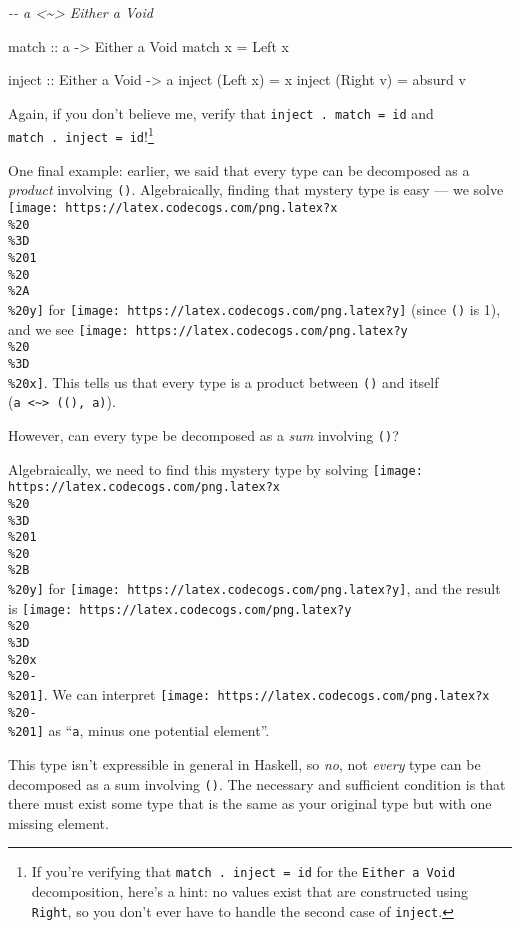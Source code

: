 \documentclass[]{article}
\newenvironment{Shaded}{}{}
\newcommand{\CommentTok}[1]{\textcolor[rgb]{0.38,0.63,0.69}{\textit{#1}}}
\newcommand{\DataTypeTok}[1]{\textcolor[rgb]{0.56,0.13,0.00}{#1}}
\newcommand{\NormalTok}[1]{#1}
\newcommand{\OtherTok}[1]{\textcolor[rgb]{0.00,0.44,0.13}{#1}}
\begin{document}
\begin{Shaded}
\begin{Highlighting}[]
\CommentTok{{-}{-} a <\textasciitilde{}> Either a Void}

\OtherTok{match ::}\NormalTok{ a }\OtherTok{{-}>} \DataTypeTok{Either}\NormalTok{ a }\DataTypeTok{Void}
\NormalTok{match x }\OtherTok{=} \DataTypeTok{Left}\NormalTok{ x}

\OtherTok{inject ::} \DataTypeTok{Either}\NormalTok{ a }\DataTypeTok{Void} \OtherTok{{-}>}\NormalTok{ a}
\NormalTok{inject (}\DataTypeTok{Left}\NormalTok{  x) }\OtherTok{=}\NormalTok{ x}
\NormalTok{inject (}\DataTypeTok{Right}\NormalTok{ v) }\OtherTok{=}\NormalTok{ absurd v}
\end{Highlighting}
\end{Shaded}

Again, if you don't believe me, verify that \texttt{inject\ .\ match\ =\ id} and
\texttt{match\ .\ inject\ =\ id}!\footnote{If you're verifying that
  \texttt{match\ .\ inject\ =\ id} for the \texttt{Either\ a\ Void}
  decomposition, here's a hint: no values exist that are constructed using
  \texttt{Right}, so you don't ever have to handle the second case of
  \texttt{inject}.}

One final example: earlier, we said that every type can be decomposed as a
\emph{product} involving \texttt{()}. Algebraically, finding that mystery type
is easy --- we solve
\texttt{[image: https://latex.codecogs.com/png.latex?x\\\%20\\\%3D\\\%201\\\%20\\\%2A\\\%20y]}
for \texttt{[image: https://latex.codecogs.com/png.latex?y]} (since \texttt{()}
is 1), and we see
\texttt{[image: https://latex.codecogs.com/png.latex?y\\\%20\\\%3D\\\%20x]}. This
tells us that every type is a product between \texttt{()} and itself
(\texttt{a\ \textless{}\textasciitilde{}\textgreater{}\ ((),\ a)}).

However, can every type be decomposed as a \emph{sum} involving \texttt{()}?

Algebraically, we need to find this mystery type by solving
\texttt{[image: https://latex.codecogs.com/png.latex?x\\\%20\\\%3D\\\%201\\\%20\\\%2B\\\%20y]}
for \texttt{[image: https://latex.codecogs.com/png.latex?y]}, and the result is
\texttt{[image: https://latex.codecogs.com/png.latex?y\\\%20\\\%3D\\\%20x\\\%20-\\\%201]}.
We can interpret
\texttt{[image: https://latex.codecogs.com/png.latex?x\\\%20-\\\%201]} as
``\texttt{a}, minus one potential element''.

This type isn't expressible in general in Haskell, so \emph{no}, not
\emph{every} type can be decomposed as a sum involving \texttt{()}. The
necessary and sufficient condition is that there must exist some type that is
the same as your original type but with one missing element.
\end{document}
